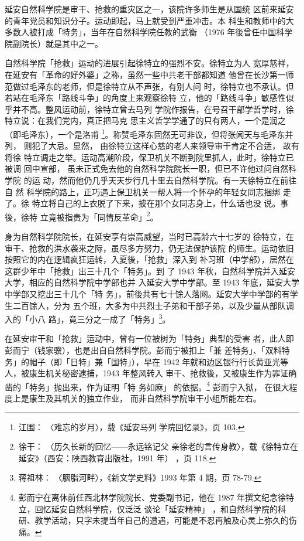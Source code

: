 延安自然科学院是审干、抢救的重灾区之一，该院许多师生是从国统
区前来延安的青年党员和知识分子。运动即起，马上就受到严重冲击。本
科生和教师中的大多数人被打成「特务」，当年在自然科学院任教的武衡
（1976 年後曾任中国科学院副院长）就是其中之一。

自然科学院「抢救」运动的进展引起徐特立的强烈不安。徐特立为人 宽厚慈祥，
在延安有「革命的好外婆」之称，虽然一些中共老干部都知道 他曾在长沙第一师
范做过毛泽东的老师，但是徐特立从不声张，有别人问 时，徐特立也不承认。但
若站在毛泽东「路线斗争」的角度上来观察徐特 立，他的「路线斗争」敏感性似
乎并不高。整风运动前，徐特立曾去马列 学院作报告，在号召干部学哲学时，徐
特立说：在我们党内，真正把马克 思主义哲学学通了的只有两人，一个是润之
（即毛泽东），一个是洛甫 \footnote{江围： 〈难忘的岁月〉，载《延安马列
学院回忆录》，页 103.}。称赞毛泽东固然无可非议，但将张闻天与毛泽东并列，
则犯了大忌。显然， 由徐特立这样心慈的老人来领导审干肯定不合适， 故有将徐
特立调走之举。运动高潮阶段，保卫机关不断到院里抓人，此时，徐特立已被调
回中宣部， 虽未正式免去他的自然科学院院长一职，但已不许他过问自然科学院
的运 动，然而他仍几乎天天步行几十里去自然科学院。有一天徐特立在前往自 然
科学院的路上，正巧遇上保卫机关一帮人将一个怀孕的年轻女同志捆绑 走了。徐
特立将自己的上衣脱了下来，披在那个女同志身上，什么话也没 说。事後，徐特
立竟被指责为「同情反革命」\footnote{徐干： 〈历久长新的回忆——永远铭记父
亲徐老的言传身教〉，载《徐特立在延安》（西安：陕西教育出版社，1991 年）
，页 118.}。

身为自然科学院院长，在延安享有崇高威望，当时已高龄六十七岁的
徐特立，在审干、抢救的洪水袭来之际，虽尽多方努力，仍无法保护该院
的师生。运动依旧按照它的内在逻辑疯狂运转，入夏後，「抢救」深入到
补习班（中学部），居然在这群少年中「抢救」出三十几个「特务」。到
了 1943 年秋，自然科学院并入延安大学，相应的自然科学院中学部也并
入延安大学中学部。至 1943 年底，延安大学中学部又挖出三十几个「特
务」，前後共有七十馀人落网。延安大学中学部的有学生二百馀人，分为
五个班，大多为中共烈士子弟和干部子弟，以及少量从部队调入的「小八
路」，竟三分之一成了「特务」\footnote{蒋祖林：
〈胭脂河畔〉，《新文学史料》1993 年第 4 期，页 78-79.}。

在延安审干和「抢救」运动中，曾有一位被树为「特务」典型的受害
者，此人即彭而宁（钱家骥），也是出自自然科学院。彭而宁被扣上「兼
差特务」、「双料特务」的帽子（即「日特」兼「国特」），早在 1942
年就和边区银行行长黄亚光等人，被康生机关秘密逮捕，1943 年整风转入
审干、抢救後，又被康生作为罪证确凿的「特务」抛出来，作为证明「特
务如麻」
的依据。\footnote{彭而宁在离休前任西北林学院院长、党委副书记，他在 1987 年撰文纪念徐特立，回忆延安自然科学院，仅泛泛
谈论「延安精神」
，和自然科学院的科研、教学活动，只字未提当年自己的遭遇，可能是不忍再触及心灵上弥久的伤痛。} 彭而宁入狱，
在很大程度上是康生及其机关的独立作业，
而非自然科学院审干小组所能左右。
 
